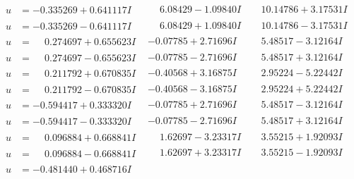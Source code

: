 \documentclass[1p]{elsarticle_modified}
\theoremstyle{definition}
\begin{document}
$$\begin{array}{c|c|c}
\begin{aligned}
u &= -0.335269 + 0.641117 I\end{aligned}
 & \phantom{-}6.08429 - 1.09840 I & \phantom{-}10.14786 + 3.17531 I \\ \hline\begin{aligned}
u &= -0.335269 - 0.641117 I\end{aligned}
 & \phantom{-}6.08429 + 1.09840 I & \phantom{-}10.14786 - 3.17531 I \\ \hline\begin{aligned}
u &= \phantom{-}0.274697 + 0.655623 I\end{aligned}
 & -0.07785 + 2.71696 I & \phantom{-}5.48517 - 3.12164 I \\ \hline\begin{aligned}
u &= \phantom{-}0.274697 - 0.655623 I\end{aligned}
 & -0.07785 - 2.71696 I & \phantom{-}5.48517 + 3.12164 I \\ \hline\begin{aligned}
u &= \phantom{-}0.211792 + 0.670835 I\end{aligned}
 & -0.40568 + 3.16875 I & \phantom{-}2.95224 - 5.22442 I \\ \hline\begin{aligned}
u &= \phantom{-}0.211792 - 0.670835 I\end{aligned}
 & -0.40568 - 3.16875 I & \phantom{-}2.95224 + 5.22442 I \\ \hline\begin{aligned}
u &= -0.594417 + 0.333320 I\end{aligned}
 & -0.07785 + 2.71696 I & \phantom{-}5.48517 - 3.12164 I \\ \hline\begin{aligned}
u &= -0.594417 - 0.333320 I\end{aligned}
 & -0.07785 - 2.71696 I & \phantom{-}5.48517 + 3.12164 I \\ \hline\begin{aligned}
u &= \phantom{-}0.096884 + 0.668841 I\end{aligned}
 & \phantom{-}1.62697 - 3.23317 I & \phantom{-}3.55215 + 1.92093 I \\ \hline\begin{aligned}
u &= \phantom{-}0.096884 - 0.668841 I\end{aligned}
 & \phantom{-}1.62697 + 3.23317 I & \phantom{-}3.55215 - 1.92093 I \\ \hline\begin{aligned}
u &= -0.481440 + 0.468716 I\end{aligned}

\end{array}$$
\end{document}

